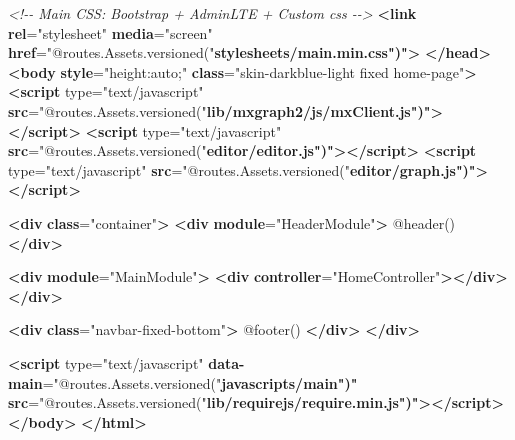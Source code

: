 \documentclass[
  11pt,
]{krantz}
\newenvironment{Shaded}{\begin{snugshade}}{\end{snugshade}}
\newcommand{\CommentTok}[1]{\textcolor[rgb]{0.37,0.37,0.37}{\textit{#1}}}
\newcommand{\ErrorTok}[1]{\textcolor[rgb]{0.14,0.14,0.14}{\textbf{#1}}}
\newcommand{\KeywordTok}[1]{\textcolor[rgb]{0.27,0.27,0.27}{\textbf{#1}}}
\newcommand{\NormalTok}[1]{#1}
\newcommand{\OtherTok}[1]{\textcolor[rgb]{0.37,0.37,0.37}{#1}}
\newcommand{\StringTok}[1]{\textcolor[rgb]{0.5,0.5,0.5}{#1}}
\begin{document}
\begin{Shaded}
\begin{Highlighting}[]
    \CommentTok{\textless{}!{-}{-} Main CSS: Bootstrap + AdminLTE + Custom css {-}{-}\textgreater{}}
    \KeywordTok{\textless{}link} \ErrorTok{rel}\OtherTok{=}\StringTok{"stylesheet"} \ErrorTok{media}\OtherTok{=}\StringTok{"screen"} \ErrorTok{href}\OtherTok{=}\StringTok{"@routes.Assets.versioned("}\ErrorTok{stylesheets/main.min.css")"}\KeywordTok{\textgreater{}}
    \KeywordTok{\textless{}/head\textgreater{}}
    \KeywordTok{\textless{}body} \ErrorTok{style}\OtherTok{=}\StringTok{"height:auto;"} \ErrorTok{class}\OtherTok{=}\StringTok{"skin{-}darkblue{-}light fixed home{-}page"}\KeywordTok{\textgreater{}}
        \KeywordTok{\textless{}script}\OtherTok{ type=}\StringTok{"text/javascript"} \ErrorTok{src}\OtherTok{=}\StringTok{"@routes.Assets.versioned("}\ErrorTok{lib/mxgraph2/js/mxClient.js")"}\KeywordTok{\textgreater{}\textless{}/script\textgreater{}}
    \KeywordTok{\textless{}script}\OtherTok{ type=}\StringTok{"text/javascript"} \ErrorTok{src}\OtherTok{=}\StringTok{"@routes.Assets.versioned("}\ErrorTok{editor/editor.js")"}\KeywordTok{\textgreater{}\textless{}/script\textgreater{}}
    \KeywordTok{\textless{}script}\OtherTok{ type=}\StringTok{"text/javascript"} \ErrorTok{src}\OtherTok{=}\StringTok{"@routes.Assets.versioned("}\ErrorTok{editor/graph.js")"}\KeywordTok{\textgreater{}\textless{}/script\textgreater{}}

    \KeywordTok{\textless{}div} \ErrorTok{class}\OtherTok{=}\StringTok{"container"}\KeywordTok{\textgreater{}}
        \KeywordTok{\textless{}div} \ErrorTok{module}\OtherTok{=}\StringTok{"HeaderModule"}\KeywordTok{\textgreater{}}
\NormalTok{            @header()}
        \KeywordTok{\textless{}/div\textgreater{}}

        \KeywordTok{\textless{}div} \ErrorTok{module}\OtherTok{=}\StringTok{"MainModule"}\KeywordTok{\textgreater{}}
            \KeywordTok{\textless{}div} \ErrorTok{controller}\OtherTok{=}\StringTok{"HomeController"}\KeywordTok{\textgreater{}\textless{}/div\textgreater{}}
        \KeywordTok{\textless{}/div\textgreater{}}

        \KeywordTok{\textless{}div} \ErrorTok{class}\OtherTok{=}\StringTok{"navbar{-}fixed{-}bottom"}\KeywordTok{\textgreater{}}
\NormalTok{            @footer()}
        \KeywordTok{\textless{}/div\textgreater{}}
        \KeywordTok{\textless{}/div\textgreater{}}

        \KeywordTok{\textless{}script}\OtherTok{ type=}\StringTok{"text/javascript"} \ErrorTok{data{-}main}\OtherTok{=}\StringTok{"@routes.Assets.versioned("}\ErrorTok{javascripts/main")"} \ErrorTok{src}\OtherTok{=}\StringTok{"@routes.Assets.versioned("}\ErrorTok{lib/requirejs/require.min.js")"}\KeywordTok{\textgreater{}\textless{}/script\textgreater{}}
    \KeywordTok{\textless{}/body\textgreater{}}
\KeywordTok{\textless{}/html\textgreater{}}
\end{Highlighting}
\end{Shaded}
\end{document}

